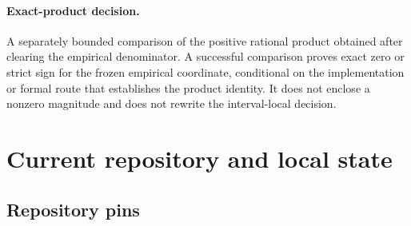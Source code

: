 \documentclass[11pt]{article}
\begin{document}
\paragraph{Exact-product decision.}
A separately bounded comparison of the positive rational product obtained after clearing the
empirical denominator.  A successful comparison proves exact zero or strict sign for the frozen
empirical coordinate, conditional on the implementation or formal route that establishes the
product identity.  It does not enclose a nonzero magnitude and does not rewrite the interval-local
decision.

\section{Current repository and local state}

\subsection{Repository pins}
\end{document}
